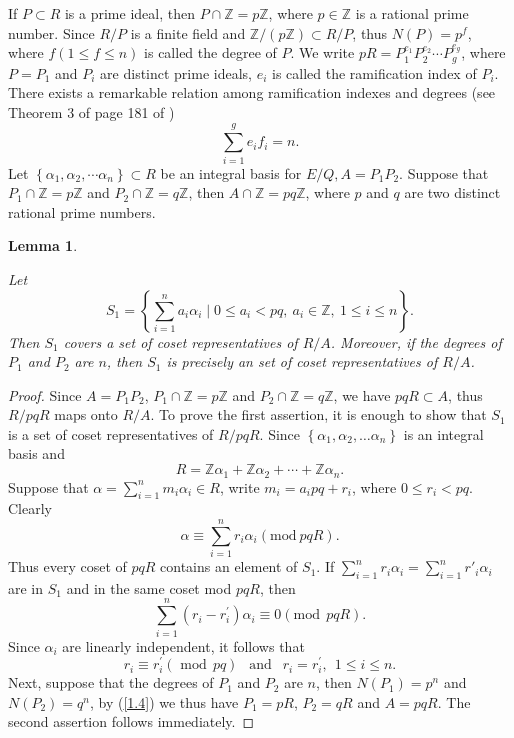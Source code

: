 \documentclass [11pt]{article}
\newtheorem{lem}[thm]{\bf Lemma}
\begin{document}
If $P \subset R$ is a prime ideal, then $P \cap \mathbb{Z}=p \mathbb{Z}$, where $p \in \mathbb{Z}$ is a rational prime number. Since $R/P$ is a finite field and $\mathbb{Z}/(p\mathbb{Z})\subset  R/P$, thus $N(P)=p^{f}$, where $f\left(1 \leq f \leq n\right)$ is called the degree of $P$. We write $p R=P_{1}^{e_{1}} P_{2}^{e_{2}} \cdots P_{g}^{e_{g}}$, where $P=P_{1}$ and $P_{i}$ are distinct prime ideals, $e_{i}$ is called the ramification index of $P_{i}$. There exists a remarkable relation among ramification indexes and degrees (see Theorem 3 of page 181 of \cite{I})
\begin{equation}\label{1.4}
\sum_{i=1}^{g} e_{i} f_{i}=n.
\end{equation}
Let $\left\{\alpha_{1}, \alpha_{2}, \cdots \alpha_{n}\right\} \subset R$ be an integral basis for $E/Q, A=P_{1} P_{2}$. Suppose that $P_{1} \cap \mathbb{Z}=p\mathbb{Z}$ and $P_{2} \cap \mathbb{Z}= q\mathbb{Z}$,  then $A \cap \mathbb{Z}= pq\mathbb{Z}$, where $p$ and $q$ are two distinct rational prime numbers.
\begin{lem}\label{lm1.1}

Let
\begin{equation}\label{1.5}
S_{1}=\left\{\sum_{i=1}^{n} a_{i} \alpha_{i} \mid 0 \leq a_{i}<p q, \ a_{i} \in \mathbb{Z},\ 1 \leq i \leq n \right\}.
\end{equation}
Then $S_{1}$ covers a set of coset representatives of $R/A$. Moreover, if the degrees of $P_{1}$  and $P_{2}$ are $n$, then $S_{1}$ is precisely an set of coset representatives of $R/A$.

\end{lem}

\begin{proof}

 Since $A=P_{1}P_{2}$,  $P_{1} \cap \mathbb{Z}=p\mathbb{Z}$ and $P_{2} \cap \mathbb{Z}=q\mathbb{Z}$, we have $pq R \subset A$, thus $R/pqR $ maps onto $R/A$. To prove the first assertion, it is enough to show that $S_{1}$ is a set of coset representatives of $R/pq R$. Since $\left\{\alpha_{1}, \alpha_{2}, \ldots \alpha_{n}\right\}$ is an integral  basis and
$$
R=\mathbb{Z}\alpha_{1}+\mathbb{Z} \alpha_{2}+\cdots +\mathbb{Z} \alpha_{n}.
$$
Suppose that $\alpha=\sum_{i=1}^{n} m_{i} \alpha_{i} \in R$, write $m_{i}=a_{i} pq+r_{i}$, where $0 \leq r_{i}<pq$. Clearly
$$
\alpha \equiv \sum_{i=1}^{n} r_{i} \alpha_{i}(\text{mod}\ pqR).
$$
Thus every coset of $ pqR$ contains an element of $ S_{1}$. If   $\sum_{i=1}^{n} r_{i}\alpha_{i}=\sum_{i=1}^{n} r'_{i}\alpha_{i} $ are in $S_{1}$ and in the same coset mod $pqR$, then
$$
\sum_{i=1}^{n}\left(r_{i}-r_{i}^{\prime}\right) \alpha_{i} \equiv 0 (\text{mod}\ \ pqR).
$$
Since $ \alpha_{i}$ are linearly independent, it follows that
$$
r_{i}\equiv r_{i}^{\prime} (\text { mod}\ \  pq)\ \ \text { and } \ \ r_{i}=r_{i}^{\prime},\ \  1 \leq i \leq n .
$$
Next, suppose that the degrees of $P_{1}$ and $P_{2}$ are $n$, then $N\left(P_{1}\right)=p^{n}$ and $N\left(P_{2}\right)=q^{n}$, by (\ref{1.4}) we thus have  $P_{1}=p R$,  $P_{2}=q R$ and $A=pq R$. The second assertion  follows immediately.
\end{proof}
\end{document}
